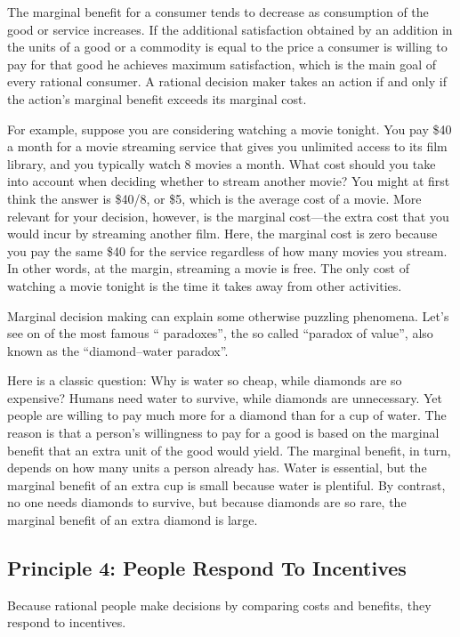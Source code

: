 The marginal benefit for a consumer tends to decrease as consumption of the good or service increases. If the
additional satisfaction obtained by an addition in the units of a good or a commodity is equal to the price a
consumer is willing to pay for that good he achieves maximum satisfaction, which is the main goal of every rational
consumer. A rational decision maker takes an action if and only if the action's marginal benefit exceeds its marginal
cost.

\be
For example, suppose you are considering watching a movie tonight. You pay \$40 a month for a movie streaming service
that gives you unlimited access to its film library, and you typically watch 8 movies a month. What cost should you
take into account when deciding whether to stream another movie? You might at first think the answer is \$40/8, or
\$5, which is the average cost of a movie. More relevant for your decision, however, is the marginal cost—the extra
cost that you would incur by streaming another film. Here, the marginal cost is zero because you pay the same \$40
for the service regardless of how many movies you stream. In other words, at the margin, streaming a movie is free.
The only cost of watching a movie tonight is the time it takes away from other activities.
\ee

Marginal decision making can explain some otherwise puzzling phenomena. Let's see on of the most famous ``
paradoxes'', the so called ``paradox of value'', also known as the ``diamond–water paradox''.

\be
Here is a classic question: Why is water so cheap, while diamonds are so expensive? Humans need water to survive,
while diamonds are unnecessary. Yet people are willing to pay much more for a diamond than for a cup of water. The
reason is that a person's willingness to pay for a good is based on the marginal benefit that an extra unit of the
good would yield. The marginal benefit, in turn, depends on how many units a person already has. Water is essential,
but the marginal benefit of an extra cup is small because water is plentiful. By contrast, no one needs diamonds to
survive, but because diamonds are so rare, the marginal benefit of an extra diamond is large.
\ee

\subsection*{Principle 4: People Respond To Incentives}

Because rational people make decisions by comparing costs and benefits, they respond to incentives.

